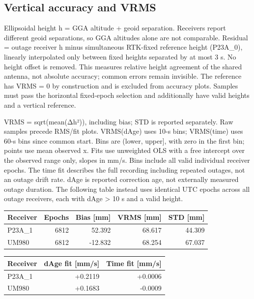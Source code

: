 \documentclass[11pt,a4paper]{article}
\numberwithin{equation}{section}
\numberwithin{figure}{section}
\begin{document}
\subsection{Vertical accuracy and VRMS}

Ellipsoidal height h = GGA altitude + geoid separation. Receivers report different geoid separations, so GGA altitudes alone are not comparable. Residual = outage receiver h minus simultaneous RTK-fixed reference height (P23A\_0), linearly interpolated only between fixed heights separated by at most 3 s. No height offset is removed. This measures relative height agreement of the shared antenna, not absolute accuracy; common errors remain invisible. The reference has VRMS = 0 by construction and is excluded from accuracy plots. Samples must pass the horizontal fixed-epoch selection and additionally have valid heights and a vertical reference.

VRMS = sqrt(mean(Δh²)), including bias; STD is reported separately. Raw samples precede RMS/\allowbreak{}fit plots. VRMS(dAge) uses 10-s bins; VRMS(time) uses 60-s bins since common start. Bins are (lower, upper], with zero in the first bin; points use mean observed x. Fits use unweighted OLS with a free intercept over the observed range only, slopes in mm/\allowbreak{}s. Bins include all valid individual receiver epochs. The time fit describes the full recording including repeated outages, not an outage drift rate. dAge is reported correction age, not externally measured outage duration. The following table instead uses identical UTC epochs across all outage receivers, each with dAge > 10 s and a valid height.

\begin{center}\begin{lrbox}{\reporttable}\small\setlength{\tabcolsep}{4pt}\begin{tabular}{lrrrr}\toprule
Receiver & Epochs & Bias [mm] & VRMS [mm] & STD [mm]\\\midrule
P23A\_1 & 6812 & 52.392 & 68.617 & 44.309\\
UM980 & 6812 & -12.832 & 68.254 & 67.037\\
\bottomrule\end{tabular}\end{lrbox}\ifdim\wd\reporttable>\linewidth\resizebox{\linewidth}{!}{\usebox{\reporttable}}\else\usebox{\reporttable}\fi\end{center}

\begin{center}\begin{lrbox}{\reporttable}\small\setlength{\tabcolsep}{4pt}\begin{tabular}{lrr}\toprule
Receiver & dAge fit [mm/\allowbreak{}s] & Time fit [mm/\allowbreak{}s]\\\midrule
P23A\_1 & +0.2119 & +0.0006\\
UM980 & +0.1683 & -0.0009\\
\bottomrule\end{tabular}\end{lrbox}\ifdim\wd\reporttable>\linewidth\resizebox{\linewidth}{!}{\usebox{\reporttable}}\else\usebox{\reporttable}\fi\end{center}
\end{document}
